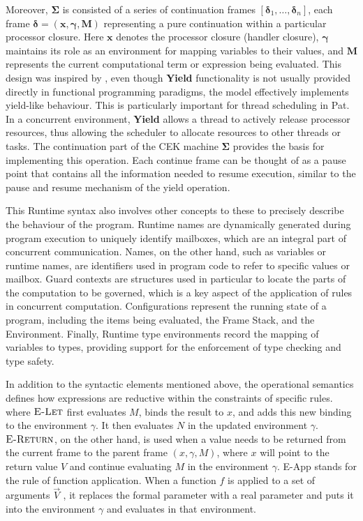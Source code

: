 \documentclass{l4proj}
\begin{document}
Moreover, $\boldsymbol{\Sigma}$ is consisted of a series of continuation frames $[\boldsymbol{\delta}_1, \ldots , \boldsymbol{\delta}_n]$, each frame $\boldsymbol{\delta} = (\boldsymbol{x}, \boldsymbol{\gamma}, \boldsymbol{M})$ representing a pure continuation within a particular processor closure. Here $\boldsymbol{x}$ denotes the processor closure (handler closure), $\boldsymbol{\gamma}$ maintains its role as an environment for mapping variables to their values, and $\boldsymbol{M}$ represents the current computational term or expression being evaluated. This design was inspired by \cite{hillerstrm_2016_liberating}, even though \textbf{Yield} functionality is not usually provided directly in functional programming paradigms, the model effectively implements yield-like behaviour. This is particularly important for thread scheduling in Pat. In a concurrent environment, \textbf{Yield} allows a thread to actively release processor resources, thus allowing the scheduler to allocate resources to other threads or tasks. The continuation part of the CEK machine $\boldsymbol{\Sigma}$ provides the basis for implementing this operation. Each continue frame can be thought of as a pause point that contains all the information needed to resume execution, similar to the pause and resume mechanism of the yield operation.

This Runtime syntax also involves other concepts to these to precisely describe the behaviour of the program. Runtime names are dynamically generated during program execution to uniquely identify mailboxes, which are an integral part of concurrent communication. Names, on the other hand, such as variables or runtime names, are identifiers used in program code to refer to specific values or mailbox. Guard contexts are structures used in particular to locate the parts of the computation to be governed, which is a key aspect of the application of rules in concurrent computation. Configurations represent the running state of a program, including the items being evaluated, the Frame Stack, and the Environment. Finally, Runtime type environments record the mapping of variables to types, providing support for the enforcement of type checking and type safety.

In addition to the syntactic elements mentioned above, the operational semantics defines how expressions are reductive within the constraints of specific rules. where $\textsc{E-Let}$ first evaluates $M$, binds the result to $x$, and adds this new binding to the environment $\gamma$. It then evaluates $N$ in the updated environment $\gamma$. $\textsc{E-Return}$, on the other hand, is used when a value needs to be returned from the current frame to the parent frame $(x, \gamma, M)$, where $x$ will point to the return value $V$ and continue evaluating $M$ in the environment $\gamma$. E-App stands for the rule of function application. When a function $f$ is applied to a set of arguments $\overrightarrow{V}$ , it replaces the formal parameter with a real parameter and puts it into the environment $\gamma$ and evaluates in that environment.
\end{document}
